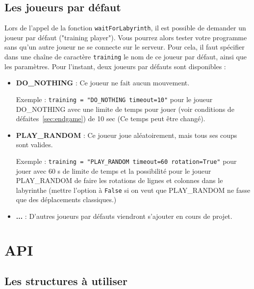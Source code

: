 \documentclass[french,12pt,a4paper,twoside,openright,titlepage]{report}
\begin{document}
\subsection{Les joueurs par défaut}
\label{sec:default}
Lors de l'appel de la fonction \verb|waitForLabyrinth|, il est possible de demander un joueur par défaut  ("training player").
Vous pourrez alors tester votre programme sans qu'un autre joueur ne se connecte sur le serveur.
Pour cela, il faut spécifier dans une chaîne de caractère \verb|training|  le nom de ce joueur par défaut, ainsi que les paramètres. Pour l'instant, deux joueurs par défauts sont disponibles : 
\begin{itemize}
\item \textbf{DO\_NOTHING} : Ce joueur ne fait aucun mouvement.

Exemple : \verb|training = "DO_NOTHING timeout=10"| pour le joueur DO\_NOTHING avec une limite de temps pour jouer (voir conditions de défaites~\ref{sec:endgame}) de 10 sec (Ce temps peut être changé).

\item \textbf{PLAY\_RANDOM} : Ce joueur joue aléatoirement, mais tous ses coups sont valides.

Exemple : \verb|training = "PLAY_RANDOM timeout=60 rotation=True"| pour jouer avec 60 s de limite de temps et la possibilité pour le joueur PLAY\_RANDOM de faire les rotations de lignes et colonnes dans le labyrinthe (mettre l'option à \verb|False| si on veut que PLAY\_RANDOM ne fasse que des déplacements classiques.)

\item \textbf{...} : D'autres joueurs par défauts viendront s'ajouter en cours de projet.

\end{itemize}

\section{\label{sec:api}API}


\subsection{Les structures à utiliser}
\end{document}
